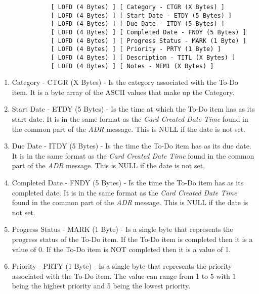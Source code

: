            \begin{verbatim}
              [ LOFD (4 Bytes) ] [ Category - CTGR (X Bytes) ]
              [ LOFD (4 Bytes) ] [ Start Date - ETDY (5 Bytes) ]
              [ LOFD (4 Bytes) ] [ Due Date - ITDY (5 Bytes) ]
              [ LOFD (4 Bytes) ] [ Completed Date - FNDY (5 Bytes) ]
              [ LOFD (4 Bytes) ] [ Progress Status - MARK (1 Byte) ]
              [ LOFD (4 Bytes) ] [ Priority - PRTY (1 Byte) ]
              [ LOFD (4 Bytes) ] [ Description - TITL (X Bytes) ]
              [ LOFD (4 Bytes) ] [ Notes - MEM1 (X Bytes) ]
            \end{verbatim}

            \begin{enumerate}
              \item Category - CTGR (X Bytes) - Is the category associated
              with the To-Do item. It is a byte array of the ASCII values that
              make up the Category.

              \item Start Date - ETDY (5 Bytes) - Is the time at which the
              To-Do item has as its start date. It is in the same format as the
              \emph{Card Created Date Time} found in the common part of the
              \emph{ADR} message. This is NULL if the date is not set.

              \item Due Date - ITDY (5 Bytes) - Is the time the To-Do item has
              as its due date. It is in the same format as the
              \emph{Card Created Date Time} found in the common part of the
              \emph{ADR} message. This is NULL if the date is not set.

              \item Completed Date - FNDY (5 Bytes) - Is the time the To-Do
              item has as its completed date. It is in the same format as the
              \emph{Card Created Date Time} found in the common part of the
              \emph{ADR} message. This is NULL if the date is not set.

              \item Progress Status - MARK (1 Byte) - Is a single byte that
              represents the progress status of the To-Do item. If the To-Do
              item is completed then it is a value of 0. If the To-Do item is
              NOT completed then it is a value of 1.

              \item Priority - PRTY (1 Byte) - Is a single byte that
              represents the priority associated with the To-Do item. The value
              can range from 1 to 5 with 1 being the highest priority and 5
              being the lowest priority.


\end{enumerate}
